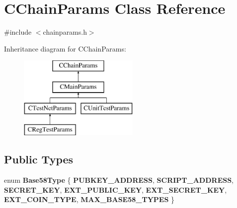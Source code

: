 \hypertarget{class_c_chain_params}{}\section{C\+Chain\+Params Class Reference}
\label{class_c_chain_params}


{\ttfamily \#include $<$chainparams.\+h$>$}

Inheritance diagram for C\+Chain\+Params\+:\begin{figure}[H]
\begin{center}
\leavevmode
\includegraphics[height=4.000000cm]{class_c_chain_params}
\end{center}
\end{figure}
\subsection*{Public Types}
\begin{DoxyCompactItemize}
\item 
\mbox{\label{class_c_chain_params_aa294058ec2e3586bd8d03d6c39667058}} 
enum {\bfseries Base58\+Type} \{ \newline
{\bfseries P\+U\+B\+K\+E\+Y\+\_\+\+A\+D\+D\+R\+E\+SS}, 
{\bfseries S\+C\+R\+I\+P\+T\+\_\+\+A\+D\+D\+R\+E\+SS}, 
{\bfseries S\+E\+C\+R\+E\+T\+\_\+\+K\+EY}, 
{\bfseries E\+X\+T\+\_\+\+P\+U\+B\+L\+I\+C\+\_\+\+K\+EY}, 
\newline
{\bfseries E\+X\+T\+\_\+\+S\+E\+C\+R\+E\+T\+\_\+\+K\+EY}, 
{\bfseries E\+X\+T\+\_\+\+C\+O\+I\+N\+\_\+\+T\+Y\+PE}, 
{\bfseries M\+A\+X\+\_\+\+B\+A\+S\+E58\+\_\+\+T\+Y\+P\+ES}
 \}
\end{DoxyCompactItemize}
